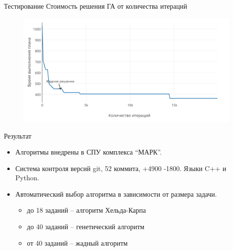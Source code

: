 \documentclass{beamer}
\begin{document}
\begin{frame}{Тестирование}
Стоимость решения ГА от количества итераций
\begin{figure}[t]
    \includegraphics[scale=0.6]{images/iter-value-20-plot.png}
\end{figure}

\end{frame}

\begin{frame}{Результат}
\begin{itemize}
\item Алгоритмы внедрены в СПУ комплекса ``МАРК''.
\item Система контроля версий git, 52 коммита, +4900 -1800. Языки C++ и Python.
\item Автоматический выбор алгоритма в зависимости от размера задачи.
    \begin{itemize}
    \item до 18 заданий -- алгоритм Хельда-Карпа
    \item до 40 заданий -- генетический алгоритм
    \item от 40 заданий -- жадный алгоритм
    \end{itemize}
\end{itemize}
\end{frame}
\end{document}
